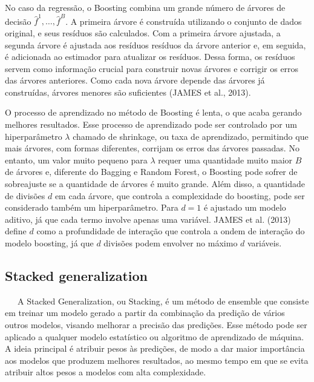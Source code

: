 \documentclass[
  12pt,
  a4paper,
]{scrreprt}
\begin{document}
\vspace{12pt}

No caso da regressão, o Boosting combina um grande número de árvores de
decisão \(\hat{f}^1, \dots, \hat{f}^B\). A primeira árvore é construída
utilizando o conjunto de dados original, e seus resíduos são calculados.
Com a primeira árvore ajustada, a segunda árvore é ajustada aos resíduos
resíduos da árvore anterior e, em seguida, é adicionada ao estimador
para atualizar os resíduos. Dessa forma, os resíduos servem como
informação crucial para construir novas árvores e corrigir os erros das
árvores anteriores. Como cada nova árvore depende das árvores já
construídas, árvores menores são suficientes (JAMES et al., 2013).

\vspace{12pt}

O processo de aprendizado no método de Boosting é lenta, o que acaba
gerando melhores resultados. Esse processo de aprendizado pode ser
controlado por um hiperparâmetro \(\lambda\) chamado de shrinkage, ou
taxa de aprendizado, permitindo que mais árvores, com formas diferentes,
corrijam os erros das árvores passadas. No entanto, um valor muito
pequeno para \(\lambda\) requer uma quantidade muito maior \(B\) de
árvores e, diferente do Bagging e Random Forest, o Boosting pode sofrer
de sobreajuste se a quantidade de árvores é muito grande. Além disso, a
quantidade de divisões \(d\) em cada árvore, que controla a complexidade
do boosting, pode ser considerado também um hiperparâmetro. Para
\(d = 1\) é ajustado um modelo aditivo, já que cada termo involve apenas
uma variável. JAMES et al. (2013) define \(d\) como a profundidade de
interação que controla a ondem de interação do modelo boosting, já que
\(d\) divisões podem envolver no máximo \(d\) variáveis.

\subsection{Stacked generalization}\label{stacked-generalization}

~~~A Stacked Generalization, ou Stacking, é um método de ensemble que
consiste em treinar um modelo gerado a partir da combinação da predição
de vários outros modelos, visando melhorar a precisão das predições.
Esse método pode ser aplicado a qualquer modelo estatístico ou algoritmo
de aprendizado de máquina. A ideia principal é atribuir pesos às
predições, de modo a dar maior importância aos modelos que produzem
melhores resultados, ao mesmo tempo em que se evita atribuir altos pesos
a modelos com alta complexidade.
\end{document}
